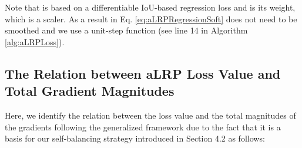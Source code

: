 \documentclass{article}
\newcommand{\comment}[1]{}
\newtheorem{theorem}{Theorem}
\newtheorem{lemma}{Lemma}
\begin{document}
Note that  is based on a differentiable IoU-based regression loss and  is its weight, which is a scaler. As a result  in Eq. \ref{eq:aLRPRegressionSoft} does not need to be smoothed and we use a unit-step function (see line 14 in Algorithm \ref{alg:aLRPLoss}).

\comment{
\subsection{Convexity of aLRP Loss}
This section discusses the convexity of aLRP Loss, and concludes that it is not convex.

\begin{lemma}
\label{lemma:IoU}
IoU Loss (i.e. ) is not convex.
\end{lemma}

\begin{proof}
This is proof by counterexample. If  were convex, then for any two sets of boxes,  and , Jensen`s inequality for  for concave functions would hold for :

However, simply setting  and  (note that , ) yields the following values for RHS and LHS of Jensen`s inequality at :
{}
Hence IoU is not concave, and IoU Loss is not convex. 
\end{proof}{}


\begin{theorem}
\label{theorem:convex}
 is not convex.
\end{theorem}

\begin{proof}
This is proof by contradiction. Assume that  is convex. Following Theorem \ref{theorem:PrimaryTerms}, we can express aLRP as follows:
{}
Since summation and division by a constant are convexity-preserving operations, if  is convex, then  is convex for any  and , that is,

Without loss of generalization, for a single  and , note that  and  are constants. Hence, if  , then   is convex, and similarly  and IoU Loss is convex. However due to Lemma \ref{lemma:IoU}, this is a contradiction and hence we conclude that aLRP loss is not convex.
\end{proof}{}
}
\subsection{The Relation between aLRP Loss Value and Total Gradient Magnitudes}
\label{subsec:SB}
Here, we identify the relation between the loss value and the total magnitudes of the gradients following the generalized framework due to the fact that it is a basis for our self-balancing strategy introduced in Section 4.2 as follows:
\end{document}
